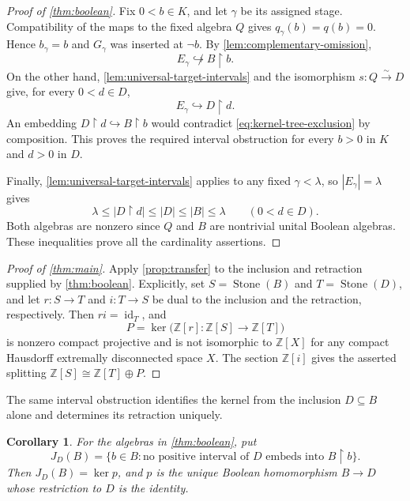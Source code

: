 \documentclass[11pt]{article}
\newtheorem{corollary}[theorem]{Corollary}
\theoremstyle{definition}
\theoremstyle{remark}
\newcommand{\Z}{\mathbb Z}
\newcommand{\Stone}{\operatorname{Stone}}
\newcommand{\restr}{\mathbin{\upharpoonright}}
\newcommand{\id}{\operatorname{id}}
\begin{document}
\begin{proof}[Proof of \cref{thm:boolean}]
Fix $0<b\in K$, and let $\gamma$ be its assigned stage. Compatibility
of the maps to the fixed algebra $Q$ gives $q_\gamma(b)=q(b)=0$.
Hence $b_\gamma=b$ and $G_\gamma$ was inserted at $\neg b$.
By \cref{lem:complementary-omission},
\begin{equation}\label{eq:kernel-tree-exclusion}
 E_\gamma\not\hookrightarrow B\restr b.
\end{equation}
On the other hand, \cref{lem:universal-target-intervals} and the
isomorphism $s:Q\xrightarrow{\sim}D$ give, for every $0<d\in D$,
\begin{equation}\label{eq:tree-in-target-interval}
 E_\gamma\hookrightarrow D\restr d.
\end{equation}
An embedding $D\restr d\hookrightarrow B\restr b$ would contradict
\eqref{eq:kernel-tree-exclusion} by composition. This proves the
required interval obstruction for every $b>0$ in $K$ and $d>0$ in $D$.

Finally, \cref{lem:universal-target-intervals} applies to any fixed
$\gamma<\lambda$, so $|E_\gamma|=\lambda$ gives
\[
 \lambda\leq |D\restr d|\leq |D|\leq |B|\leq\lambda
 \qquad(0<d\in D).
\]
Both algebras are nonzero since $Q$ and $B$ are nontrivial unital
Boolean algebras. These inequalities prove all the cardinality
assertions.
\end{proof}

\begin{proof}[Proof of \cref{thm:main}]
Apply \cref{prop:transfer} to the inclusion and retraction supplied by
\cref{thm:boolean}. Explicitly, set $S=\Stone(B)$ and $T=\Stone(D)$,
and let $r:S\to T$ and $i:T\to S$ be dual to the inclusion and the
retraction, respectively. Then $ri=\id_T$, and
\[
 P=\ker\bigl(\Z[r]:\Z[S]\to\Z[T]\bigr)
\]
is nonzero compact projective and is not isomorphic to $\Z[X]$ for any
compact Hausdorff extremally disconnected space $X$. The section
$\Z[i]$ gives the asserted splitting
$\Z[S]\cong\Z[T]\oplus P$.
\end{proof}

The same interval obstruction identifies the kernel from the inclusion
$D\subseteq B$ alone and determines its retraction uniquely.

\begin{corollary}\label{cor:intrinsic-kernel}
For the algebras in \cref{thm:boolean}, put
\[
 J_D(B)=\{b\in B:\text{no positive interval of }D
                       \text{ embeds into }B\restr b\}.
\]
Then $J_D(B)=\ker p$, and $p$ is the unique Boolean homomorphism
$B\to D$ whose restriction to $D$ is the identity.
\end{corollary}
\end{document}

